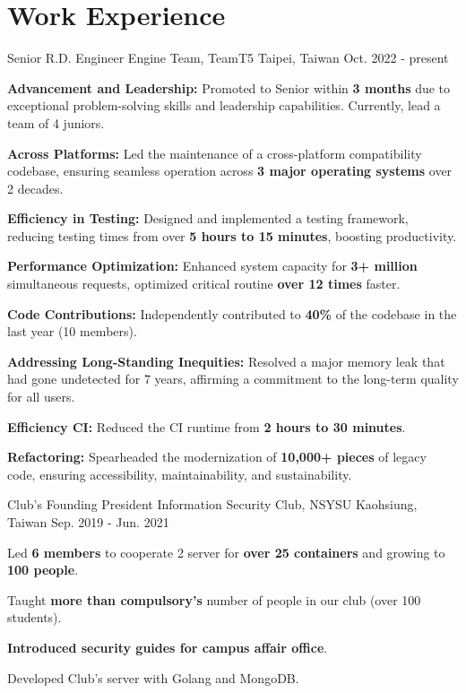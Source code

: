\section*{Work Experience}
\vspace{-.8em}
\cventry
{Senior R.D. Engineer} %
{Engine Team, TeamT5} %
{Taipei, Taiwan} %
{Oct. 2022 - present} %
{
  \begin{cvitem}
    \item \textbf{Advancement and Leadership:} Promoted to Senior within \textbf{3 months} due to exceptional problem-solving skills and leadership capabilities. Currently, lead a team of 4 juniors.
    \item \textbf{Across Platforms:} Led the maintenance of a cross-platform compatibility codebase, ensuring seamless operation across \textbf{3 major operating systems} over 2 decades.
    \item \textbf{Efficiency in Testing:}  Designed and implemented a testing framework, reducing testing times from over \textbf{5 hours to 15 minutes}, boosting productivity.
    \item \textbf{Performance Optimization:} Enhanced system capacity for \textbf{3+ million} simultaneous requests, optimized critical routine \textbf{over 12 times} faster.
    \item \textbf{Code Contributions:} Independently contributed to \textbf{40\%} of the codebase in the last year (10 members).
    \item \textbf{Addressing Long-Standing Inequities:} Resolved a major memory leak that had gone undetected for 7 years, affirming a commitment to the long-term quality for all users.
    \item \textbf{Efficiency CI:} Reduced the CI runtime from \textbf{2 hours to 30 minutes}.
    \item \textbf{Refactoring:} Spearheaded the modernization of \textbf{10,000+ pieces} of legacy code, ensuring accessibility, maintainability, and sustainability.
  \end{cvitem}
}

\cventry
{Club's Founding President} %
{Information Security Club, NSYSU} %
{Kaohsiung, Taiwan} %
{Sep. 2019 - Jun. 2021} %
{
  \begin{cvitem} %
    \item {Led \textbf{6 members} to cooperate 2 server for \textbf{over 25 containers} and growing to \textbf{100 people}.}
    \item {Taught \textbf{more than compulsory's} number of people in our club (over 100 students).}
    \item {\textbf{Introduced security guides for campus affair office}.}
    \item {Developed Club's server with Golang and MongoDB.}
  \end{cvitem}
}
